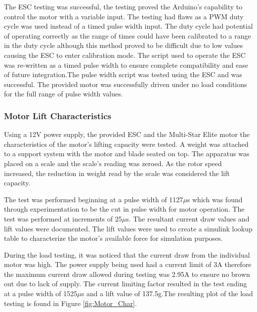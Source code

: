 The ESC testing was successful, the testing proved the Arduino's capability to control the motor with a variable input. The testing had flaws as a PWM duty cycle was used instead of a timed pulse width input. The duty cycle had potential of operating correctly as the range of times could have been calibrated to a range in the duty cycle although this method proved to be difficult due to low values causing the ESC to enter calibration mode. The script used to operate the ESC was re-written as a timed pulse width to ensure complete compatibility and ease of future integration.The pulse width script was tested using the ESC and was successful. The provided motor was successfully driven under no load conditions for the full range of pulse width values.

 \subsubsection{Motor Lift Characteristics}
 
 Using a 12V power supply, the provided ESC and the Multi-Star Elite motor the characteristics of the motor's lifting capacity were tested. A weight was attached to a support system with the motor and blade seated on top. The apparatus was placed on a scale and the scale's reading was zeroed. As the rotor speed increased, the reduction in weight read by the scale was considered the lift capacity.
 
 The test was performed beginning at a pulse width of 1127$\mu$s which was found through experimentation to be the cut in pulse width for motor operation. The test was performed at increments of 25$\mu$s. The resultant current draw values and lift values were documented. The lift values were used to create a simulink lookup table to characterize the motor's available force for simulation purposes. 
 
 During the load testing, it was noticed that the current draw from the individual motor was high. The power supply being used had a current limit of 3A therefore the maximum current draw allowed during testing was 2.95A to ensure no brown out due to lack of supply. The current limiting factor resulted in the test ending at a pulse width of 1525$\mu$s and a lift value of 137.5g.The resulting plot of the load testing is found in Figure \ref{fig:Motor_Char}.
 
